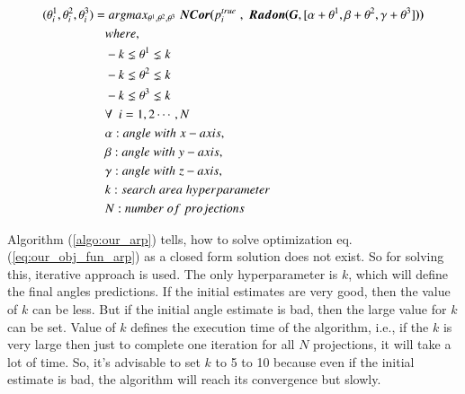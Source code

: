 \documentclass[twoside]{iitbreport}
\begin{document}
\begin{equation}\label{eq:our_obj_fun_arp}
  \begin{aligned}
    (\theta^1_i,\theta^2_i,\theta^3_i)  = & \hspace{0.1cm} argmax_{\theta^1,\theta^2,\theta^3} \hspace{0.1cm} \boldsymbol{NCor(}  p_i^{true}\hspace{0.1cm} , \hspace{0.1cm} \boldsymbol{Radon(G}, [ \alpha+\theta^1,\beta+\theta^2,\gamma+\theta^3 ] \boldsymbol{)} \boldsymbol{)}\\
    & where,\\
    &  -k \lneq \theta^1 \lneq k\\
    &  -k \lneq \theta^2 \lneq k\\
    &  -k \lneq \theta^3 \lneq k\\
    &  \forall \enspace i = 1,2 \cdots , N\\
    & \alpha : angle\hspace{0.1cm}with\hspace{0.1cm}x-axis,\\
    & \beta : angle\hspace{0.1cm}with\hspace{0.1cm}y-axis,\\
    & \gamma : angle\hspace{0.1cm}with\hspace{0.1cm}z-axis,\\
    &  k : search\hspace{0.1cm}area\hspace{0.1cm}hyperparameter \\
    & N: number\hspace{0.1cm}of\hspace{0.1cm}projections\\
  \end{aligned}
\end{equation}

Algorithm (\ref{algo:our_arp}) tells, how to solve optimization eq. (\ref{eq:our_obj_fun_arp}) as a closed form solution does not exist. So for solving this, iterative approach is used. The only hyperparameter is ${k}$, which will define the final angles predictions. If the initial estimates are very good, then the value of ${k}$ can be less. But if the initial angle estimate is bad, then the large value for ${k}$ can be set. Value of ${k}$ defines the execution time of the algorithm, i.e., if the ${k}$ is very large then just to complete one iteration for all ${N}$ projections, it will take a lot of time. So, it's advisable to set ${k}$ to 5 to 10 because even if the initial estimate is bad, the algorithm will reach its convergence but slowly.\\ \\  
\end{document}
